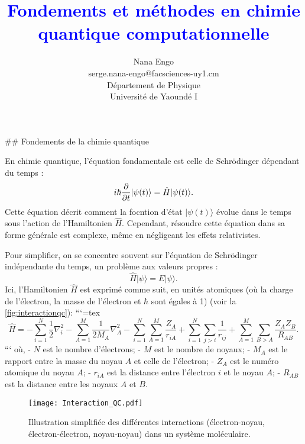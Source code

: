 \documentclass[12pt,a4paper]{report}
\title{\textcolor{blue}{Fondements et méthodes en chimie quantique computationnelle}}
\author{Nana Engo\\serge.nana-engo@facsciences-uy1.cm\\
Département de Physique\\ Université de Yaoundé I}
\date{
    \vspace{8cm} %
    \begin{center}
        \begin{minipage}{0.3\textwidth}
        \centering
            \texttt{[image: Neo\_Logo.jpg]}
        \end{minipage}
        \hfill
        \begin{minipage}{0.3\textwidth}
        \centering
        Novembre 2024
        \end{minipage}
        \hfill %
        \begin{minipage}{0.3\textwidth}
        \centering
            \texttt{[image: UY1\_Logo]}
        \end{minipage}
    \end{center}
}
\begin{document}
\pagestyle{logo}

\renewcommand{\arraystretch}{1.2}

\maketitle\begin{markdown}


## Fondements de la chimie quantique

En chimie quantique, l'équation fondamentale est celle de Schrödinger dépendant du temps :
\begin{equation}
i\hbar \pdv{t} |\psi(t)\rangle = \hat{H} |\psi(t)\rangle .
\end{equation}
Cette équation décrit comment la focntion d'état $|\psi(t)\rangle$ évolue dans le temps sous l'action de l'Hamiltonien $\hat{H}$. Cependant, résoudre cette équation dans sa forme générale est complexe, même en négligeant les effets relativistes.

Pour simplifier, on se concentre souvent sur l'équation de Schrödinger indépendante du temps, un problème aux valeurs propres :
\begin{equation}
\hat{H} |\psi\rangle = E |\psi\rangle .
\end{equation}
Ici, l’Hamiltonien $\hat{H}$ est exprimé comme suit, en unités atomiques (où la charge de l'électron, la masse de l'électron et $\hbar$ sont égales à 1) (voir la \autoref{fig:interactionqc}):
```{=tex}
\begin{equation}
\hat{H} = -\sum_{i=1}^N \frac12 \nabla_i^2 - \sum_{A=1}^M \frac{1}{2M_A} \nabla_A^2 - \sum_{i=1}^N \sum_{A=1}^M \frac{Z_A}{r_{iA}} + \sum_{i=1}^N \sum_{j>i} \frac{1}{r_{ij}} + \sum_{A=1}^M \sum_{B>A} \frac{Z_A Z_B}{R_{AB}} .
\end{equation}
```
où,
- $N$ est le nombre d'électrons;
- $M$ est le nombre de noyaux;
- $M_A$ est le rapport entre la masse du noyau $A$ et celle de l'électron;
- $Z_A$ est le numéro atomique du noyau $A$;
- $r_{iA}$ est la distance entre l’électron $i$ et le noyau $A$;
- $R_{AB}$ est la distance entre les noyaux $A$ et $B$.

\begin{figure}[tbph]
\centering
\texttt{[image: Interaction\_QC.pdf]}
\caption{Illustration simplifiée des différentes interactions (électron-noyau, électron-électron, noyau-noyau) dans un système moléculaire.}
\label{fig:interactionqc}
\end{figure}


\end{markdown}
\end{document}
